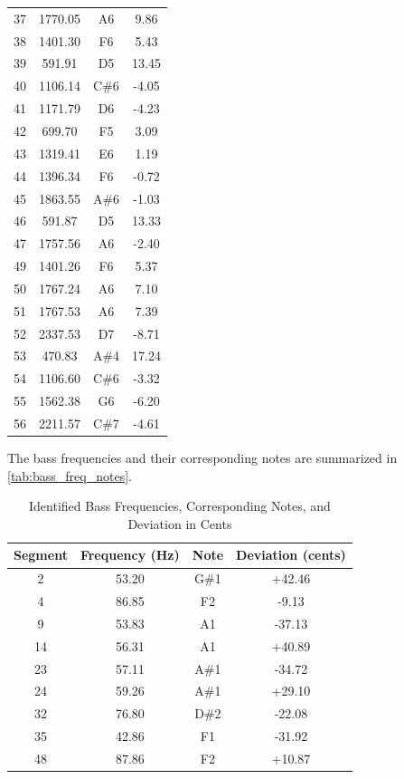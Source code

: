 \begin{table}[H]
\begin{tabular}{cccc}
        37 & 1770.05 & A6    & 9.86    \\
        38 & 1401.30 & F6    & 5.43    \\
        39 & 591.91  & D5    & 13.45   \\
        40 & 1106.14 & C\#6  & -4.05   \\
        41 & 1171.79 & D6    & -4.23   \\
        42 & 699.70  & F5    & 3.09    \\
        43 & 1319.41 & E6    & 1.19    \\
        44 & 1396.34 & F6    & -0.72   \\
        45 & 1863.55 & A\#6  & -1.03   \\
        46 & 591.87  & D5    & 13.33   \\
        47 & 1757.56 & A6    & -2.40   \\
        49 & 1401.26 & F6    & 5.37    \\
        50 & 1767.24 & A6    & 7.10    \\
        51 & 1767.53 & A6    & 7.39    \\
        52 & 2337.53 & D7    & -8.71   \\
        53 & 470.83  & A\#4  & 17.24   \\
        54 & 1106.60 & C\#6  & -3.32   \\
        55 & 1562.38 & G6    & -6.20   \\
        56 & 2211.57 & C\#7  & -4.61   \\
        \hline
    \end{tabular}
    \label{tab:melody_freq_notes}
\end{table}

The bass frequencies and their corresponding notes are summarized in \autoref{tab:bass_freq_notes}. 

\begin{table}[H]
    \centering
    \caption{Identified Bass Frequencies, Corresponding Notes, and Deviation in Cents}
    \begin{tabular}{cccc}
        \hline
        Segment & Frequency (Hz) & Note & Deviation (cents) \\
        \hline
        2  & 53.20  & G\#1  & +42.46 \\
        4  & 86.85  & F2    & -9.13  \\
        9  & 53.83  & A1    & -37.13 \\
        14 & 56.31  & A1    & +40.89 \\
        23 & 57.11  & A\#1  & -34.72 \\
        24 & 59.26  & A\#1  & +29.10 \\
        32 & 76.80  & D\#2  & -22.08 \\
        35 & 42.86  & F1    & -31.92 \\
        48 & 87.86  & F2    & +10.87 \\
        \hline
    \end{tabular}
    \label{tab:bass_freq_notes}
\end{table}

